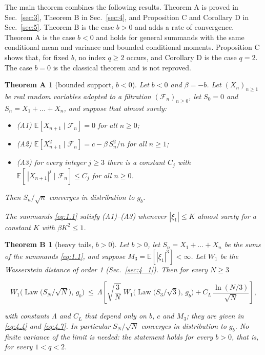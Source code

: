 \documentclass[aip,jmp,preprint,onecolumn,floatfix,superscriptaddress,nofootinbib,11pt]{revtex4-2}
\theoremstyle{plain}
\newtheorem*{theoremA}{Theorem A}
\newtheorem*{theoremB}{Theorem B}
\theoremstyle{remark}
\numberwithin{equation}{section}
\newcommand{\E}{\mathbb{E}}
\newcommand{\Law}{\operatorname{Law}}
\begin{document}
The main theorem combines the following results. Theorem A is proved in Sec.~\ref{sec:3}, Theorem B in Sec.~\ref{sec:4}, and Proposition C and Corollary D in Sec.~\ref{sec:5}. Theorem B is the case $b>0$ and adds a rate of convergence. Theorem A is the case $b<0$ and holds for general summands with the same conditional mean and variance and bounded conditional moments. Proposition C shows that, for fixed $b$, no index $q\ge2$ occurs, and Corollary D is the case $q=2$. The case $b=0$ is the classical theorem and is not reproved.

\begin{theoremA}[bounded support, $b<0$]

Let $b<0$ and $\beta=-b$. Let $(X_n)_{n\ge1}$ be real random variables adapted to a filtration $(\mathcal F_n)_{n\ge0}$, let $S_0=0$ and $S_n=X_1+\dots+X_n$, and suppose that almost surely:

\begin{itemize}
\item (A1) $\E[X_{n+1}\mid\mathcal F_n]=0$ for all $n\ge0$;
\item (A2) $\E[X_{n+1}^{2}\mid\mathcal F_n]=c-\beta\,S_n^{2}/n$ for all $n\ge1$;
\item (A3) for every integer $j\ge3$ there is a constant $C_j$ with $\E[\,|X_{n+1}|^{j}\mid\mathcal F_n]\le C_j$ for all $n\ge0$.
\end{itemize}

Then $S_n/\sqrt n$ converges in distribution to $g_b$.

The summands \eqref{eq:1.1} satisfy (A1)--(A3) whenever $|\xi_1|\le K$ almost surely for a constant $K$ with $\beta K^{2}\le1$.

\end{theoremA}




\begin{theoremB}[heavy tails, $b>0$]

Let $b>0$, let $S_n=X_1+\dots+X_n$ be the sums of the summands \eqref{eq:1.1}, and suppose $M_3=\E[|\xi_1|^{3}]<\infty$. Let $W_1$ be the Wasserstein distance of order 1 (Sec.~\ref{sec:4_1}). Then for every $N\ge3$

\begin{equation}
W_1\Big(\Law\big(S_N/\sqrt N\big),\,g_b\Big)\ \le\ \Lambda\left[\sqrt{\frac{3}{N}}\;W_1\Big(\Law\big(S_3/\sqrt 3\big),\,g_b\Big)+C_L\,\frac{\ln (N/3)}{\sqrt N}\right],
\label{eq:1.5}
\end{equation}

with constants $\Lambda$ and $C_L$ that depend only on $b$, $c$ and $M_3$; they are given in \eqref{eq:4.4} and \eqref{eq:4.7}. In particular $S_N/\sqrt N$ converges in distribution to $g_b$. No finite variance of the limit is needed: the statement holds for every $b>0$, that is, for every $1<q<2$.

\end{theoremB}
\end{document}
